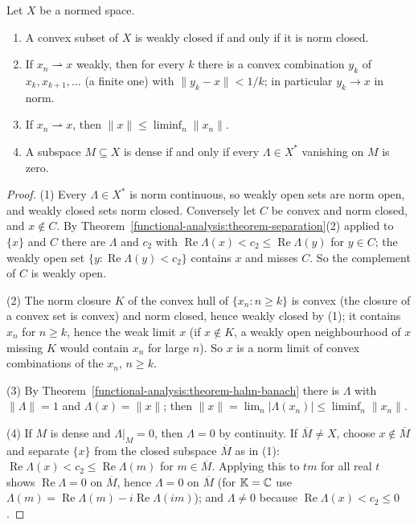 \begin{corollary}[Mazur]\label{functional-analysis:corollary-mazur}
Let $X$ be a normed space.
\begin{enumerate}
\item A convex subset of $X$ is weakly closed if and only if it is norm closed.
\item If $x_n \rightharpoonup x$ weakly, then for every $k$ there is a convex combination $y_k$ of $x_k, x_{k+1}, \ldots$ (a finite one) with $\|y_k - x\| < 1/k$; in particular $y_k \to x$ in norm.
\item If $x_n \rightharpoonup x$, then $\|x\| \leq \liminf_n\|x_n\|$.
\item A subspace $M \subseteq X$ is dense if and only if every $\Lambda \in X^*$ vanishing on $M$ is zero.
\end{enumerate}
\end{corollary}

\begin{proof}
(1) Every $\Lambda \in X^*$ is norm continuous, so weakly open sets are norm open, and weakly closed sets norm closed. Conversely let $C$ be convex and norm closed, and $x \notin C$. By
Theorem~\ref{functional-analysis:theorem-separation}(2) applied to $\{x\}$ and $C$ there are $\Lambda$ and $c_2$ with $\operatorname{Re}\Lambda(x) < c_2 \leq \operatorname{Re}\Lambda(y)$ for $y \in C$; the weakly open set
$\{y : \operatorname{Re}\Lambda(y) < c_2\}$ contains $x$ and misses $C$. So the complement of $C$ is weakly open.

(2) The norm closure $K$ of the convex hull of $\{x_n : n \geq k\}$ is convex (the closure of a convex set is convex) and norm closed, hence weakly closed by (1); it contains $x_n$ for $n \geq k$, hence the weak
limit $x$ (if $x \notin K$, a weakly open neighbourhood of $x$ missing $K$ would contain $x_n$ for large $n$). So $x$ is a norm limit of convex combinations of the $x_n$, $n \geq k$.

(3) By Theorem~\ref{functional-analysis:theorem-hahn-banach} there is $\Lambda$ with $\|\Lambda\| = 1$ and $\Lambda(x) = \|x\|$; then $\|x\| = \lim_n|\Lambda(x_n)| \leq \liminf_n\|x_n\|$.

(4) If $M$ is dense and $\Lambda|_M = 0$, then $\Lambda = 0$ by continuity. If $\overline{M} \neq X$, choose $x \notin \overline{M}$ and separate $\{x\}$ from the closed subspace $\overline{M}$ as in (1):
$\operatorname{Re}\Lambda(x) < c_2 \leq \operatorname{Re}\Lambda(m)$ for $m \in \overline{M}$. Applying this to $tm$ for all real $t$ shows $\operatorname{Re}\Lambda = 0$ on $\overline{M}$, hence $\Lambda = 0$ on $\overline{M}$ (for
$\mathbb{K} = \mathbb{C}$ use $\Lambda(m) = \operatorname{Re}\Lambda(m) - i\operatorname{Re}\Lambda(im)$); and $\Lambda \neq 0$ because $\operatorname{Re}\Lambda(x) < c_2 \leq 0$.
\end{proof}


